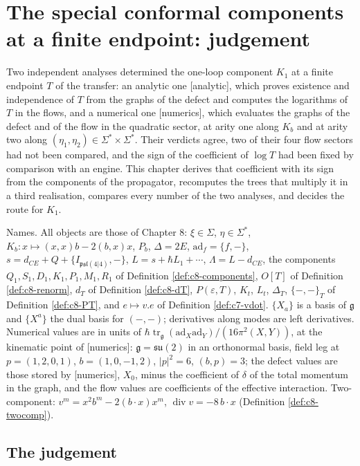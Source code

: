 \chapter{The special conformal components at a finite endpoint: judgement}

Two independent analyses determined the one-loop component $K_1$ at a finite endpoint $T$ of the transfer: an analytic one [analytic], which proves existence and independence of $T$ from the graphs of the defect and computes the logarithms of $T$ in the flows, and a numerical one [numerics], which evaluates the graphs of the defect and of the flow in the quadratic sector, at arity one along $K_b$ and at arity two along $(\eta_1,\eta_2)\in\Sigma^*\times\Sigma^*$. Their verdicts agree, two of their four flow sectors had not been compared, and the sign of the coefficient of $\log T$ had been fixed by comparison with an engine. This chapter derives that coefficient with its sign from the components of the propagator, recomputes the trees that multiply it in a third realisation, compares every number of the two analyses, and decides the route for $K_1$.

Names. All objects are those of Chapter 8: $\xi\in\Sigma$, $\eta\in\Sigma^*$, $K_b\colon x\mapsto(x,x)b-2(b,x)x$, $P_b$, $\Delta=2E$, $\mathrm{ad}_f=\{f,-\}$, $s=d_{CE}+Q+\{I_{\mathfrak{psl}(4|4)},-\}$, $L=s+\hbar L_1+\cdots$, $\Lambda=L-d_{CE}$, the components $Q_1,S_1,D_1,K_1,P_1,M_1,R_1$ of Definition \ref{def:c8-components}, $O[T]$ of Definition \ref{def:c8-renorm}, $d_T$ of Definition \ref{def:c8-dT}, $P(\varepsilon,T)$, $K_t$, $L_t$, $\Delta_T$, $\{-,-\}_T$ of Definition \ref{def:c8-PT}, and $e\mapsto v.e$ of Definition \ref{def:c7-vdot}. $\{X_a\}$ is a basis of $\mathfrak g$ and $\{X^a\}$ the dual basis for $(-,-)$; derivatives along modes are left derivatives. Numerical values are in units of $\hbar\operatorname{tr}_{\mathfrak g}(\mathrm{ad}_X\mathrm{ad}_Y)/(16\pi^2(X,Y))$, at the kinematic point of [numerics]: $\mathfrak g=\mathfrak{su}(2)$ in an orthonormal basis, field leg at $p=(1,2,0,1)$, $b=(1,0,-1,2)$, $|p|^2=6$, $(b,p)=3$; the defect values are those stored by [numerics], $X_0$, minus the coefficient of $\delta$ of the total momentum in the graph, and the flow values are coefficients of the effective interaction. Two-component: $v^m=x^2b^m-2(b\cdot x)x^m$, $\operatorname{div}v=-8\,b\cdot x$ (Definition \ref{def:c8-twocomp}).

\section{The judgement}

